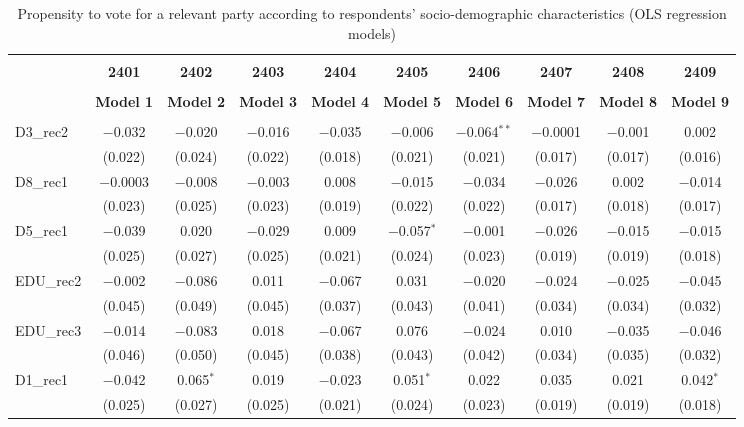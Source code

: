 \documentclass[
]{article}
\begin{document}
\begin{table}[!htbp] \centering 
  \caption{Propensity to vote for a relevant party according to respondents' 
                     socio-demographic characteristics (OLS regression models)} 
  \label{table:full_ols_si} 
\begin{tabular}{@{\extracolsep{5pt}}lccccccccc} 
\\[-1.8ex]\hline \\[-1.8ex] 
 & \textbf{2401} & \textbf{2402} & \textbf{2403} & \textbf{2404} & \textbf{2405} & \textbf{2406} & \textbf{2407} & \textbf{2408} & \textbf{2409} \\ 
\\[-1.8ex] & \textbf{Model 1} & \textbf{Model 2} & \textbf{Model 3} & \textbf{Model 4} & \textbf{Model 5} & \textbf{Model 6} & \textbf{Model 7} & \textbf{Model 8} & \textbf{Model 9}\\ 
\hline \\[-1.8ex] 
 D3\_rec2 & $-$0.032 & $-$0.020 & $-$0.016 & $-$0.035 & $-$0.006 & $-$0.064$^{**}$ & $-$0.0001 & $-$0.001 & 0.002 \\ 
  & (0.022) & (0.024) & (0.022) & (0.018) & (0.021) & (0.021) & (0.017) & (0.017) & (0.016) \\ 
  D8\_rec1 & $-$0.0003 & $-$0.008 & $-$0.003 & 0.008 & $-$0.015 & $-$0.034 & $-$0.026 & 0.002 & $-$0.014 \\ 
  & (0.023) & (0.025) & (0.023) & (0.019) & (0.022) & (0.022) & (0.017) & (0.018) & (0.017) \\ 
  D5\_rec1 & $-$0.039 & 0.020 & $-$0.029 & 0.009 & $-$0.057$^{*}$ & $-$0.001 & $-$0.026 & $-$0.015 & $-$0.015 \\ 
  & (0.025) & (0.027) & (0.025) & (0.021) & (0.024) & (0.023) & (0.019) & (0.019) & (0.018) \\ 
  EDU\_rec2 & $-$0.002 & $-$0.086 & 0.011 & $-$0.067 & 0.031 & $-$0.020 & $-$0.024 & $-$0.025 & $-$0.045 \\ 
  & (0.045) & (0.049) & (0.045) & (0.037) & (0.043) & (0.041) & (0.034) & (0.034) & (0.032) \\ 
  EDU\_rec3 & $-$0.014 & $-$0.083 & 0.018 & $-$0.067 & 0.076 & $-$0.024 & 0.010 & $-$0.035 & $-$0.046 \\ 
  & (0.046) & (0.050) & (0.045) & (0.038) & (0.043) & (0.042) & (0.034) & (0.035) & (0.032) \\ 
  D1\_rec1 & $-$0.042 & 0.065$^{*}$ & 0.019 & $-$0.023 & 0.051$^{*}$ & 0.022 & 0.035 & 0.021 & 0.042$^{*}$ \\ 
  & (0.025) & (0.027) & (0.025) & (0.021) & (0.024) & (0.023) & (0.019) & (0.019) & (0.018) \\ 

\end{tabular}
\end{table}
\end{document}

